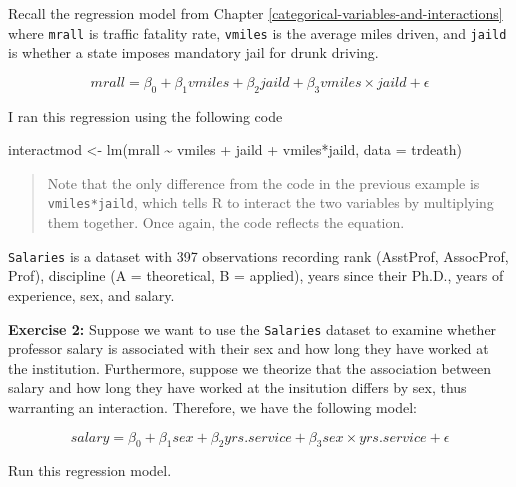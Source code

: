 \documentclass[
]{book}
\makeatletter
\newenvironment{Shaded}{\begin{snugshade}}{\end{snugshade}}
\newcommand{\AttributeTok}[1]{\textcolor[rgb]{0.61,0.61,0.61}{#1}}
\newcommand{\FunctionTok}[1]{\textcolor[rgb]{0,0,0}{#1}}
\newcommand{\NormalTok}[1]{#1}
\newcommand{\OtherTok}[1]{\textcolor[rgb]{0.37,0.37,0.37}{#1}}
\newcommand{\SpecialCharTok}[1]{\textcolor[rgb]{0,0,0}{#1}}
\newenvironment{kframe}{%
\medskip{}
\setlength{\fboxsep}{.8em}
 \def\at@end@of@kframe{}%
 \ifinner\ifhmode%
  \def\at@end@of@kframe{\end{minipage}}%
  \begin{minipage}{\columnwidth}%
 \fi\fi%
 \def\FrameCommand##1{\hskip\@totalleftmargin \hskip-\fboxsep
 \colorbox{shadecolor}{##1}\hskip-\fboxsep
     \hskip-\linewidth \hskip-\@totalleftmargin \hskip\columnwidth}%
 \MakeFramed {\advance\hsize-\width
   \@totalleftmargin\z@ \linewidth\hsize
   \@setminipage}}%
 {\par\unskip\endMakeFramed%
 \at@end@of@kframe}
\renewenvironment{Shaded}{\begin{kframe}}{\end{kframe}}
\newenvironment{rmdblock}[1]
  {\begin{shaded*}
  }
  {\end{shaded*}
  }
\newenvironment{learncheck}
  {\begin{rmdblock}{warning}}
  {\end{rmdblock}}
\makeatother
\begin{document}
Recall the regression model from Chapter \ref{categorical-variables-and-interactions} where \texttt{mrall} is traffic fatality rate, \texttt{vmiles} is the average miles driven, and \texttt{jaild} is whether a state imposes mandatory jail for drunk driving.

\begin{equation}
mrall = \beta_0 + \beta_1 vmiles + \beta_2 jaild + \beta_3 vmiles \times jaild + \epsilon
\end{equation}

I ran this regression using the following code

\begin{Shaded}
\begin{Highlighting}[]
\NormalTok{interactmod }\OtherTok{\textless{}{-}} \FunctionTok{lm}\NormalTok{(mrall }\SpecialCharTok{\textasciitilde{}}\NormalTok{ vmiles }\SpecialCharTok{+}\NormalTok{ jaild }\SpecialCharTok{+}\NormalTok{ vmiles}\SpecialCharTok{*}\NormalTok{jaild, }\AttributeTok{data =}\NormalTok{ trdeath)}
\end{Highlighting}
\end{Shaded}

\begin{quote}
Note that the only difference from the code in the previous example is \texttt{vmiles*jaild}, which tells R to interact the two variables by multiplying them together. Once again, the code reflects the equation.
\end{quote}

\texttt{Salaries} is a dataset with 397 observations recording rank (AsstProf, AssocProf, Prof), discipline (A = theoretical, B = applied), years since their Ph.D., years of experience, sex, and salary.

\begin{learncheck}
\textbf{Exercise 2:} Suppose we want to use the \texttt{Salaries}
dataset to examine whether professor salary is associated with their sex
and how long they have worked at the institution. Furthermore, suppose
we theorize that the association between salary and how long they have
worked at the insitution differs by sex, thus warranting an interaction.
Therefore, we have the following model:

\begin{equation}
salary = \beta_0 + \beta_1sex + \beta_2yrs.service + \beta_3 sex \times yrs.service + \epsilon
\end{equation}

Run this regression model.
\end{learncheck}
\end{document}
